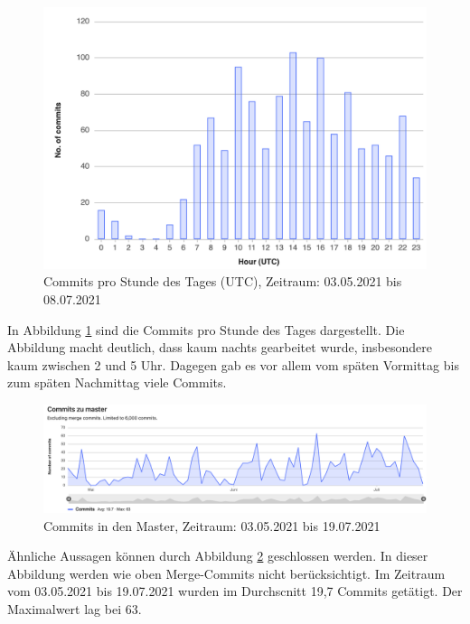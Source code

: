 \documentclass[../review_3.tex]{subfiles}
\begin{document}
\begin{figure} [H]
    \centering
    \includegraphics[width =0.65\linewidth]{img/gitlab4.png}
    \caption{Commits pro Stunde des Tages (UTC), Zeitraum: 03.05.2021 bis 08.07.2021}
    \label{gitlab4}
\end{figure}
In Abbildung \ref{gitlab4} sind die Commits pro Stunde des Tages dargestellt. Die Abbildung macht deutlich, dass kaum nachts gearbeitet wurde, insbesondere kaum zwischen 2 und 5 Uhr. Dagegen gab es vor allem vom späten Vormittag bis zum späten Nachmittag viele Commits.

\begin{figure} [H]
    \centering
    \includegraphics[width =\linewidth]{img/commitsToMaster.png}
    \caption{Commits in den Master, Zeitraum: 03.05.2021 bis 19.07.2021}
    \label{commitsToMaster}
\end{figure}
Ähnliche Aussagen können durch Abbildung \ref{commitsToMaster} geschlossen werden. In dieser Abbildung werden wie oben Merge-Commits nicht berücksichtigt. Im Zeitraum vom 03.05.2021 bis 19.07.2021 wurden im Durchscnitt 19,7 Commits getätigt. Der Maximalwert lag bei 63.
\end{document}
